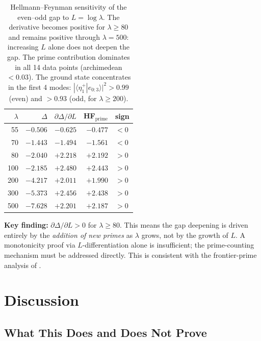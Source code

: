 \documentclass[12pt,a4paper]{article}
\theoremstyle{definition}
\theoremstyle{remark}
\begin{document}
\begin{table}[h]
\centering
\renewcommand{\arraystretch}{1.15}
\begin{tabular}{r|r|r|r|l}
$\lambda$ & $\Delta$ & $\partial\Delta/\partial L$ & HF$_{\mathrm{prime}}$ & sign \\\hline
55  & $-0.506$ & $-0.625$ & $-0.477$ & $<0$ \\
70  & $-1.443$ & $-1.494$ & $-1.561$ & $<0$ \\
80  & $-2.040$ & $+2.218$ & $+2.192$ & $>0$ \\
100 & $-2.185$ & $+2.480$ & $+2.443$ & $>0$ \\
200 & $-4.217$ & $+2.011$ & $+1.990$ & $>0$ \\
300 & $-5.373$ & $+2.456$ & $+2.438$ & $>0$ \\
500 & $-7.628$ & $+2.201$ & $+2.187$ & $>0$ \\
\end{tabular}
\caption{Hellmann--Feynman sensitivity of the even--odd gap to $L = \log\lambda$. The derivative becomes positive for $\lambda \geq 80$ and remains positive through $\lambda = 500$: increasing $L$ alone does not deepen the gap. The prime contribution dominates in all 14 data points (archimedean $< 0.03$). The ground state concentrates in the first 4 modes: $|\langle \eta^+_1 | e_{0{:}3} \rangle|^2 > 0.99$ (even) and $> 0.93$ (odd, for $\lambda \geq 200$).}
\label{tab:hf-results}
\end{table}

\noindent\textbf{Key finding:} $\partial\Delta/\partial L > 0$ for $\lambda \geq 80$. This means the gap deepening is driven entirely by the \emph{addition of new primes} as $\lambda$ grows, not by the growth of $L$. A monotonicity proof via $L$-differentiation alone is insufficient; the prime-counting mechanism must be addressed directly. This is consistent with the frontier-prime analysis of .


\section{Discussion}
\label{sec:discussion}

\subsection{What This Does and Does Not Prove}
\end{document}
